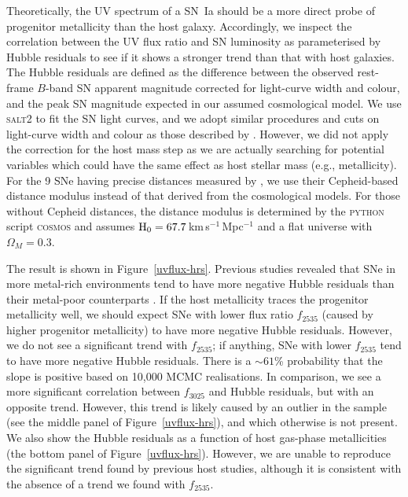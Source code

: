 \documentclass[useAMS,usenatbib]{mn2e}
\begin{document}
Theoretically, the UV spectrum of a SN~Ia should be a more direct probe of progenitor metallicity than the host galaxy. Accordingly, we inspect the correlation between the UV flux ratio and SN luminosity as parameterised by Hubble residuals to see if it shows a stronger trend than that with host galaxies. The Hubble residuals are defined as the difference between the observed rest-frame $B$-band SN apparent magnitude corrected for light-curve width and colour, and the peak SN magnitude expected in our assumed cosmological model. We use \textsc{salt2} \citep{2007A&A...466...11G} to fit the SN light curves, and we adopt similar procedures and cuts on light-curve width and colour as those described by \citet{2018MNRAS.475..193F}. However, we did not apply the correction for the host mass step as we are actually searching for potential variables which could have the same effect as host stellar mass (e.g., metallicity). For the 9 SNe having precise distances measured by \citet{2016ApJ...826...56R}, we use their Cepheid-based distance modulus instead of that derived from the cosmological models. For those without Cepheid distances, the distance modulus is determined by the \textsc{python} script \textsc{cosmos} and assumes $\rm H_{0}=67.7$\,km\,s$^{-1}$\,Mpc$^{-1}$ and a flat universe with $\Omega_{M}=0.3$.

The result is shown in Figure~\ref{uvflux-hrs}. Previous studies revealed that SNe in more metal-rich environments tend to have more negative Hubble residuals than their metal-poor counterparts \citep[e.g.,][]{2014MNRAS.438.1391P}. If the host metallicity traces the progenitor metallicity well, we should expect SNe with lower flux ratio $f_{2535}$ (caused by higher progenitor metallicity) to have more negative Hubble residuals. However, we do not see a significant trend with $f_{2535}$; if anything, SNe with lower $f_{2535}$ tend to have more negative Hubble residuals. There is a $\sim61$\% probability that the slope is positive based on 10,000 MCMC realisations. In comparison, we see a more significant correlation between $f_{3025}$ and Hubble residuals, but with an opposite trend. However, this trend is likely caused by an outlier in the sample (see the middle panel of Figure~\ref{uvflux-hrs}), and which otherwise is not present. We also show the Hubble residuals as a function of host gas-phase metallicities (the bottom panel of Figure~\ref{uvflux-hrs}). However, we are unable to reproduce the significant trend found by previous host studies, although it is consistent with the absence of a trend we found with $f_{2535}$.
\end{document}
